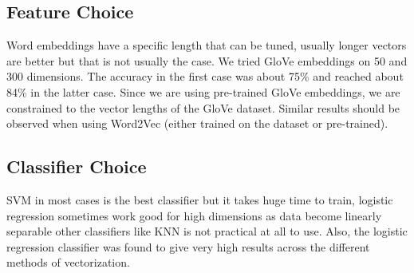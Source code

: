 \documentclass{article}
\begin{document}
	
	\subsection{Feature Choice}
	
	Word embeddings have a specific length that can be tuned, usually longer vectors are better but that is not usually the case. We tried GloVe embeddings on 50 and 300 dimensions. The accuracy in the first case was about 75\% and reached about 84\% in the latter case. Since we are using pre-trained GloVe embeddings, we are constrained to the vector lengths of the GloVe dataset. Similar results should be observed when using Word2Vec (either trained on the dataset or pre-trained).
	
	
	\subsection{Classifier Choice}
	SVM in most cases is the best classifier but it takes huge time to train, logistic regression sometimes work good for high dimensions as data become linearly separable other classifiers like KNN is not practical at all to use. Also, the logistic regression classifier was found to give very high results across the different methods of vectorization.
 
\printbibliography
	
	
\end{document}
